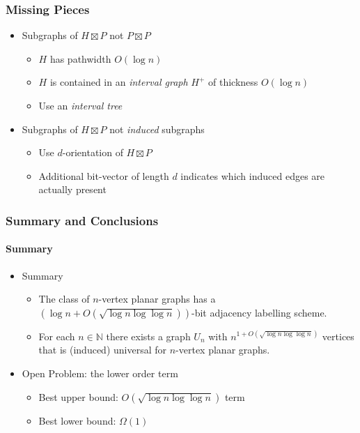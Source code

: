 \documentclass[aspectratio=169,xcolor=dvipsnames]{beamer}
\newcommand{\N}{\mathbb{N}}
\begin{document}
\begin{frame}
    \frametitle{Missing Pieces}

    \begin{itemize}[<+->]
        \item Subgraphs of $H\boxtimes P$ not $P\boxtimes P$
        \begin{itemize}
            \item $H$ has pathwidth $O(\log n)$
            \item $H$ is contained in an \emph{interval graph} $H^+$ of thickness $O(\log n)$
            \item Use an \emph{interval tree}
        \end{itemize}

        \item Subgraphs of $H\boxtimes P$ not \emph{induced} subgraphs
        \begin{itemize}
            \item Use $d$-orientation of $H\boxtimes P$
            \item Additional bit-vector of length $d$ indicates which induced edges are actually present
        \end{itemize}
    \end{itemize}
\end{frame}


\begin{frame}
    \frametitle{Summary and Conclusions}
    \framesubtitle{Summary}

    \begin{itemize}[<+->]
        \item Summary
        \begin{itemize}
            \item The class of $n$-vertex planar graphs has a $(\log n + O(\sqrt{\log n\log\log n}))$-bit adjacency labelling scheme.

            \item For each $n\in\N$ there exists a graph $U_n$ with $n^{1+O(\sqrt{\log n\log\log n})}$ vertices that is (induced) universal for $n$-vertex planar graphs.
        \end{itemize}
        \item Open Problem: the lower order term
        \begin{itemize}
            \item Best upper bound: $O(\sqrt{\log n\log\log n})$ term
            \item Best lower bound: $\Omega(1)$
        \end{itemize}
    \end{itemize}
\end{frame}
\end{document}
